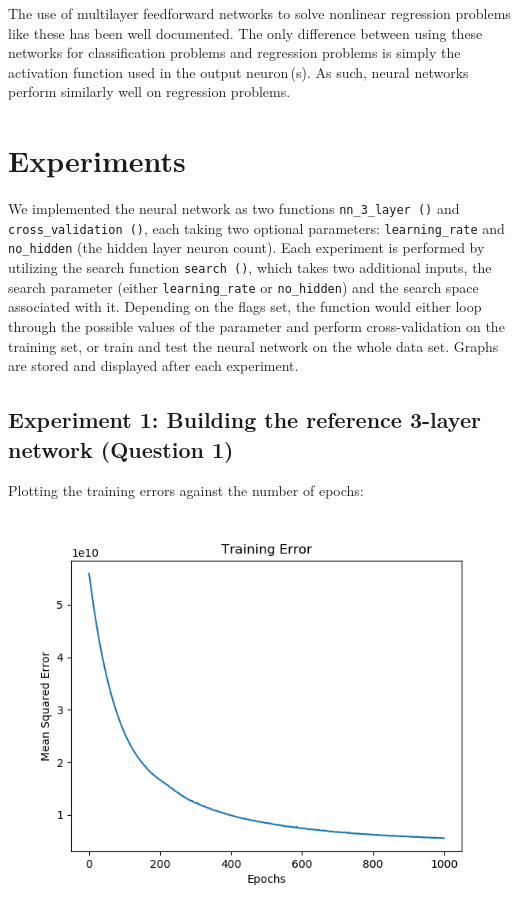 The use of multilayer feedforward networks to solve nonlinear regression
problems like these has been well documented. The only difference between
using these networks for classification problems and regression problems
is simply the activation function used in the output neuron\,(s). As such,
neural networks perform similarly well on regression problems.

\section*{Experiments}

We implemented the neural network as two functions
\texttt{nn\_3\_layer\,()} and \texttt{cross\_validation\,()}, each
taking two optional parameters: \texttt{learning\_rate} and
\texttt{no\_hidden} (the hidden layer neuron count).
Each experiment is performed by utilizing the search function
\texttt{search\,()}, which takes two additional inputs, the search parameter
(either \texttt{learning\_rate} or \texttt{no\_hidden}) and the
search space associated with it. Depending on the flags set, the function
would either loop through the possible values of the parameter and perform
cross-validation on the training set, or train and test the neural
network on the whole data set. Graphs are stored and displayed after
each experiment.

\subsection*{Experiment 1: Building the reference 3-layer network (Question 1)}

Plotting the training errors against the number of epochs:

\begin{center}
    \includegraphics[width=\imgw]{images/p1b1_sample_train.png}   
\end{center}

